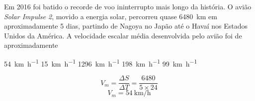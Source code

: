 \question [20] Em 2016 foi batido o recorde de voo ininterrupto mais longo da história. O avião \textit{Solar Impulse 2}, movido a energia solar, percorreu quase \SI{6480}{\kilo\meter} em aproximadamente 5 dias, partindo de Nagoya no Japão até o Havaí nos Estados Unidos da América. A velocidade escalar média desenvolvida pelo avião foi de aproximadamente 


		\begin{EnvUplevel}
			\begin{choices}
			
			\correctchoice \SI[per-mode=fraction]{54}{\kilo\meter\per\hour}   
			\choice \SI[per-mode=fraction]{15}{\kilo\meter\per\hour}     
			\choice \SI[per-mode=fraction]{1296}{\kilo\meter\per\hour}       
			\choice \SI[per-mode=fraction]{198}{\kilo\meter\per\hour}      
			\choice \SI[per-mode=fraction]{99}{\kilo\meter\per\hour}  
				
			\end{choices}
		\end{EnvUplevel}
		
		\begin{EnvUplevel}
		\begin{solution}
		$$
		V_m=\frac{\Delta S}{\Delta T}=\frac{6480}{5\times24}
		$$$$
		V_m=\SI[per-mode=fraction]{54}{\kilo\meter\per\hour}
		$$
		\end{solution}
		\end{EnvUplevel}


	
